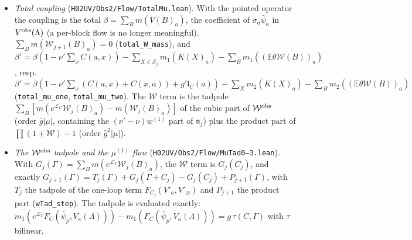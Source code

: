 \documentclass[11pt]{amsart}
\theoremstyle{definition}
\theoremstyle{remark}
\numberwithin{equation}{section}
\newcommand{\E}{\mathbb{E}}
\newcommand{\Loc}{\operatorname{Loc}}
\begin{document}
\begin{itemize}
  $\sigma_a$-components of $K(X)$ for $X\not\ni a$; such components are generated by $\mathcal W^{\rm obs}(B)$,
  $B\not\ni a$, and would not be contracted. The map therefore localises at $a$ for every $X$:
  the pointed operator is $\operatorname{loc}^a_{X,Y}F$ for $a\in X$ and
  $(|Y|/|X|)\operatorname{loc}^a_{\{a\},\{a\}}F$ for $a\notin X$
  (\texttt{locAp}, \texttt{locBp}, \texttt{H02UV/Obs2/Loc/Loc.lean}; for $a\notin X^\square$ the components vanish, so only
  $a\in X^\square\setminus X$ matters). Then $\Loc_{X,X}$ extracts the full mass of $F_a$ for every polymer, and
  the contraction $\|F-m(F)\bar\psi_a\|_{T_{j+1}(\ell')}\le CL^{-1}\|F\|_{T_j(\ell)}$ for $a\in X^\square$ holds
  (\texttt{exists\_odd\_contract\_pt}, \texttt{exists\_even\_contract\_pt}). The coalescence, support and
  reproduction statements are adapted (\texttt{H02UV/Obs2/Map/Supp}, \texttt{Coal}, \texttt{CoalHist}, \texttt{EstLoc}:
  far-from-$a$ conditions are now distances $\ge L^j$, and $\operatorname{loc}^a$ is supported on $Y^\square\cup\{a\}$).
\item \emph{Total coupling} (\texttt{H02UV/Obs2/Flow/TotalMu.lean}). With the pointed operator the coupling is the total
  $\beta=\sum_Bm(V(B)_a)$, the coefficient of $\sigma_a\bar\psi_a$ in $V^{\rm obs}(\Lambda)$ (a per-block flow is no
  longer meaningful). $\sum_Bm(\mathcal W_{j+1}(B)_a)=0$ (\texttt{total\_W\_mass}), and
  $\beta'=\beta(1-\nu'\sum_xC(a,x))-\sum_{X\in\mathcal S_j}m_1(K(X)_a)-\sum_Bm_1((\E\theta\mathcal W(B))_a)$, resp.
  $\beta'=\beta(1-\nu'\sum_x(C(a,x)+C(x,a))+g'\mathfrak l_C(a))-\sum_Xm_2(K(X)_a)-\sum_Bm_2((\E\theta\mathcal W(B))_a)$
  (\texttt{total\_mu\_one}, \texttt{total\_mu\_two}). The $\mathcal W$ term is the tadpole
  $\sum_B[m(e^{\mathcal L_C}\mathcal W_j(B)_a)-m(\mathcal W_j(B)_a)]$ of the cubic part of $\mathcal W^{\rm obs}$
  (order $\bar g|\mu|$, containing the $(\nu'-\nu)w^{(1)}$ part of $\mathfrak n_j$) plus the product part of
  $\prod(1+\mathcal W)-1$ (order $\bar g^2|\mu|$).
\item \emph{The $\mathcal W^{\rm obs}$ tadpole and the $\mu^{(1)}$ flow} (\texttt{H02UV/Obs2/Flow/MuTad0--3.lean}). With
  $G_j(\Gamma)=\sum_Bm(e^{\mathcal L_\Gamma}\mathcal W_j(B)_a)$, the $\mathcal W$ term is $G_j(C_j)$, and exactly
  $G_{j+1}(\Gamma)=T_j(\Gamma)+G_j(\Gamma+C_j)-G_j(C_j)+P_{j+1}(\Gamma)$, with $T_j$ the tadpole of the one-loop term
  $F_{C_j}(V'_a,V'_\varnothing)$ and $P_{j+1}$ the product part (\texttt{wTad\_step}). The tadpole is evaluated exactly:
  $m_1(e^{\mathcal L_\Gamma}F_C(\bar\psi_p,V_\kappa(\Lambda)))-m_1(F_C(\bar\psi_p,V_\kappa(\Lambda)))=g\,\tau(C,\Gamma)$ with $\tau$ bilinear,

\end{itemize}
\end{document}
